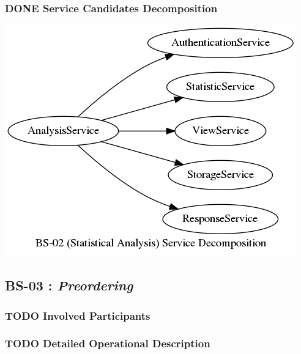\documentclass[11pt]{article}
\begin{document}
\subsubsection{{\bfseries\sffamily DONE} Service Candidates Decomposition}
\label{sec:org583cb6b}
\begin{center}
\includegraphics[width=.9\linewidth]{res/bs_02_dcmp.png}
\end{center}
\newpage
\subsection{\label{orgfe2ab91}BS-03 : \emph{Preordering}}
\label{sec:orgedd10d8}
\subsubsection{{\bfseries\sffamily TODO} Involved Participants}
\label{sec:org6cbc38e}
\subsubsection{{\bfseries\sffamily TODO} Detailed Operational Description}
\label{sec:orgd29d95b}
\end{document}
